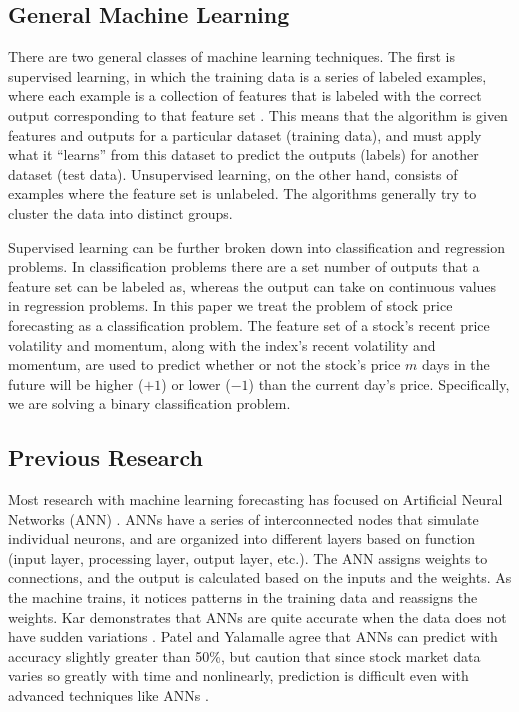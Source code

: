\documentclass[pageno]{jpaper}
\begin{document}
\subsection{General Machine Learning}
There are two general classes of machine learning techniques. The first is supervised learning, in which the training data is a series of labeled examples, where each example is a collection of features that is labeled with the correct output corresponding to that feature set \cite{brownlee}. This means that the algorithm is given features and outputs for a particular dataset (training data), and must apply what it ``learns'' from this dataset to predict the outputs (labels) for another dataset (test data). Unsupervised learning, on the other hand, consists of examples where the feature set is unlabeled. The algorithms generally try to cluster the data into distinct groups.

Supervised learning can be further broken down into classification and regression problems. In classification problems there are a set number of outputs that a feature set can be labeled as, whereas the output can take on continuous values in regression problems. In this paper we treat the problem of stock price forecasting as a classification problem. The feature set of a stock's recent price volatility and momentum, along with the index's recent volatility and momentum, are used to predict whether or not the stock's price $m$ days in the future will be higher ($+1$) or lower ($-1$) than the current day's price. Specifically, we are solving a binary classification problem.

\subsection{Previous Research}
\label{subsec: previous}

Most research with machine learning forecasting has focused on Artificial Neural Networks (ANN) \cite{krollner}. ANNs have a series of interconnected nodes that simulate individual neurons, and are organized into different layers based on function (input layer, processing layer, output layer, etc.). The ANN assigns weights to connections, and the output is calculated based on the inputs and the weights. As the machine trains, it notices patterns in the training data and reassigns the weights. Kar demonstrates that ANNs are quite accurate when the data does not have sudden variations \cite{kar}. Patel and Yalamalle agree that ANNs can predict with accuracy slightly greater than 50\%, but caution that since stock market data varies so greatly with time and nonlinearly, prediction is difficult even with advanced techniques like ANNs \cite{patel}.
\end{document}
